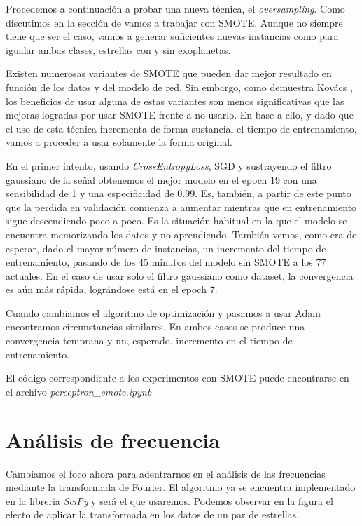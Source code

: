 Procedemos a continuación a probar una nueva técnica, el \textit{oversampling}. Como discutimos en la sección de  vamos a trabajar con SMOTE. Aunque no siempre tiene que ser el caso, vamos a generar suficientes nuevas instancias como para igualar ambas clases, estrellas con y sin exoplanetas.

Existen numerosas variantes de SMOTE que pueden dar mejor resultado en función de los datos y del modelo de red. Sin embargo, como demuestra Kovács \cite{SMOTE-comparison}, los beneficios de usar alguna de estas variantes son menos significativas que las mejoras logradas por usar SMOTE frente a no usarlo. En base a ello, y dado que el uso de esta técnica incrementa de forma sustancial el tiempo de entrenamiento, vamos a proceder a usar solamente la forma original.


En el primer intento, usando \textit{CrossEntropyLoss}, SGD y sustrayendo el filtro gaussiano de la señal obtenemos el mejor modelo en el epoch 19 con una sensibilidad de 1 y una especificidad de 0.99. Es, también, a partir de este punto que la perdida en validación comienza a aumentar mientras que en entrenamiento sigue descendiendo poco a poco. Es la situación habitual en la que el modelo se encuentra memorizando los datos y no aprendiendo. También vemos, como era de esperar, dado el mayor número de instancias, un incremento del tiempo de entrenamiento, pasando de los 45 minutos del modelo sin SMOTE a los 77 actuales. En el caso de usar solo el filtro gaussiano como dataset, la convergencia es aún más rápida, lográndose está en el epoch 7.

Cuando cambiamos el algoritmo de optimización y pasamos a usar Adam encontramos circunstancias similares. En ambos casos se produce una convergencia temprana y un, esperado, incremento en el tiempo de entrenamiento.

El código correspondiente a los experimentos con SMOTE puede encontrarse en el archivo \textit{perceptron\_smote.ipynb}

\section{Análisis de frecuencia}

Cambiamos el foco ahora para adentrarnos en el análisis de las frecuencias mediante la transformada de Fourier. El algoritmo ya se encuentra implementado en la librería \textit{SciPy} y será el que usaremos. Podemos observar en la figura  el efecto de aplicar la transformada en los datos de un par de estrellas.  

